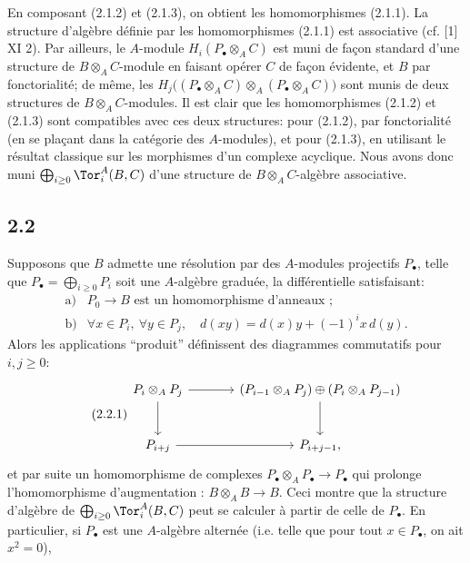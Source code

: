 En
composant (2.1.2) et (2.1.3), on obtient les homomorphismes (2.1.1). La structure d'algèbre définie par les homomorphismes (2.1.1) est associative (cf. [1] XI 2). Par ailleurs, le \(A\)-module \(H_i(P_\bullet\otimes_A C)\) est muni de façon standard d'une structure de \(B\otimes_A C\)-module en faisant opérer \(C\) de façon évidente, et \(B\) par fonctorialité; de même, les \(H_j\bigl((P_\bullet\otimes_A C)\otimes_A(P_\bullet\otimes_A C)\bigr)\) sont munis de deux structures de \(B\otimes_A C\)-modules. Il est clair que les homomorphismes (2.1.2) et (2.1.3) sont compatibles avec ces deux structures: pour (2.1.2), par fonctorialité (en se plaçant dans la catégorie des \(A\)-modules), et pour (2.1.3), en utilisant le résultat classique sur les morphismes d'un complexe acyclique. Nous avons donc muni \(\bigoplus_{i\ge0}\Tor_i^A(B,C)\) d'une structure de \(B\otimes_A C\)-algèbre associative.

\subsection*{2.2}
Supposons que \(B\) admette une résolution par des \(A\)-modules projectifs \(P_\bullet\), telle que \(P_\bullet=\bigoplus_{i\ge0}P_i\) soit une \(A\)-algèbre graduée, la différentielle satisfaisant:
\[
\begin{array}{ll}
\text{a)}& P_0\longrightarrow B\text{ est un homomorphisme d'anneaux~;}\\[0.4ex]
\text{b)}& \forall x\in P_i,\ \forall y\in P_j,\quad d(xy)=d(x)y+(-1)^i x\,d(y).
\end{array}
\]
Alors les applications ``produit'' définissent des diagrammes commutatifs pour \(i,j\ge0\):
\begin{equation}\tag{2.2.1}
\begin{tikzcd}[column sep=large,row sep=large]
P_i\otimes_A P_j \arrow[r] \arrow[d] & (P_{i-1}\otimes_A P_j)\oplus(P_i\otimes_A P_{j-1}) \arrow[d]\\
P_{i+j} \arrow[r] & P_{i+j-1},
\end{tikzcd}
\end{equation}
et par suite un homomorphisme de complexes \(P_\bullet\otimes_A P_\bullet\to P_\bullet\) qui prolonge l'homomorphisme d'augmentation : \(B\otimes_A B\to B\). Ceci montre que la structure d'algèbre de \(\bigoplus_{i\ge0}\Tor_i^A(B,C)\) peut se calculer à partir de celle de \(P_\bullet\). En particulier, si \(P_\bullet\) est une \(A\)-algèbre alternée (i.e. telle que pour tout \(x\in P_\bullet\), on ait \(x^2=0\)),
